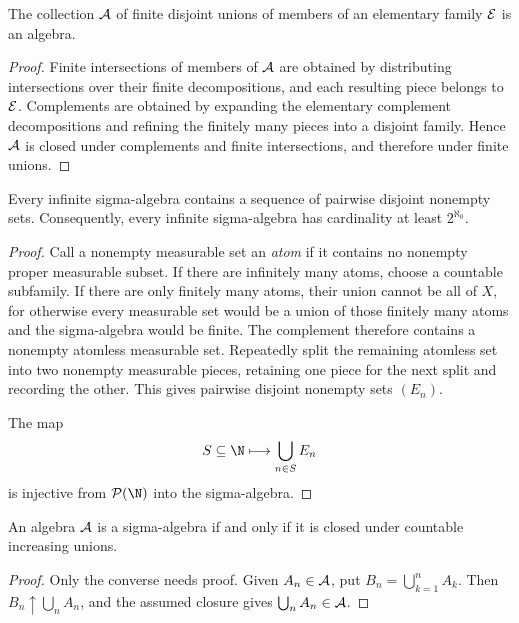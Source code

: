\begin{prop}
The collection $\mathcal{A}$ of finite disjoint unions of members of an elementary family $\mathcal{E}$ is an algebra.
\end{prop}

\begin{proof}
Finite intersections of members of $\mathcal{A}$ are obtained by distributing intersections over their finite decompositions, and each resulting piece belongs to $\mathcal{E}$. Complements are obtained by expanding the elementary complement decompositions and refining the finitely many pieces into a disjoint family. Hence $\mathcal{A}$ is closed under complements and finite intersections, and therefore under finite unions.
\end{proof}

\begin{prop}
Every infinite sigma-algebra contains a sequence of pairwise disjoint nonempty sets. Consequently, every infinite sigma-algebra has cardinality at least $2^{\aleph_0}$.
\end{prop}

\begin{proof}
Call a nonempty measurable set an \emph{atom} if it contains no nonempty proper measurable subset. If there are infinitely many atoms, choose a countable subfamily. If there are only finitely many atoms, their union cannot be all of $X$, for otherwise every measurable set would be a union of those finitely many atoms and the sigma-algebra would be finite. The complement therefore contains a nonempty atomless measurable set. Repeatedly split the remaining atomless set into two nonempty measurable pieces, retaining one piece for the next split and recording the other. This gives pairwise disjoint nonempty sets $(E_n)$.

The map
\[
S\subseteq\N\longmapsto\bigcup_{n\in S}E_n
\]
is injective from $\pow(\N)$ into the sigma-algebra.
\end{proof}

\begin{prop}
An algebra $\mathcal{A}$ is a sigma-algebra if and only if it is closed under countable increasing unions.
\end{prop}

\begin{proof}
Only the converse needs proof. Given $A_n\in\mathcal{A}$, put $B_n=\bigcup_{k=1}^nA_k$. Then $B_n\uparrow\bigcup_nA_n$, and the assumed closure gives $\bigcup_nA_n\in\mathcal{A}$.
\end{proof}

